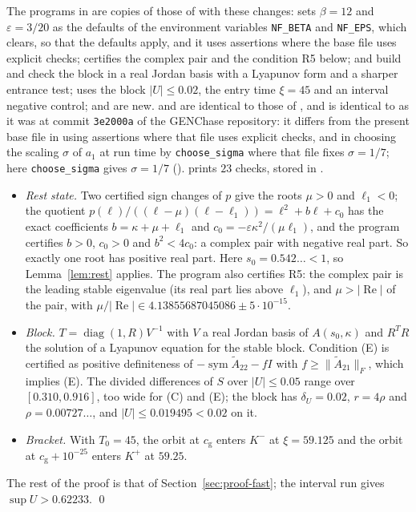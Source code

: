 \documentclass[11pt]{article}
\theoremstyle{definition}
\newcommand{\eps}{\varepsilon}
\newcommand{\re}{\operatorname{Re}}
\newcommand{\sym}{\operatorname{sym}}
\begin{document}
The programs in  are copies of those of  with these changes:  sets $\beta = 12$ and $\eps = 3/20$ as the defaults of the environment variables \texttt{NF\_BETA} and \texttt{NF\_EPS}, which  clears, so that the defaults apply, and it uses assertions where the base file uses explicit checks;  certifies the complex pair and the condition R5 below;  and  build and check the block in a real Jordan basis with a Lyapunov form and a sharper entrance test;  uses the block $|U| \le 0.02$, the entry time $\xi = 45$ and an interval negative control;  and  are new.  and  are identical to those of , and  is identical to  as it was at commit \texttt{3e2000a} of the GENChase repository: it differs from the present base file in using assertions where that file uses explicit checks, and in choosing the scaling $\sigma$ of $a_1$ at run time by \texttt{choose\_sigma} where that file fixes $\sigma = 1/7$; here \texttt{choose\_sigma} gives $\sigma = 1/7$ ().  prints $23$ checks, stored in .
\begin{itemize}
\item \emph{Rest state.} Two certified sign changes of $p$ give the roots $\mu > 0$ and $\ell_1 < 0$; the quotient $p(\ell)/((\ell - \mu)(\ell - \ell_1)) = \ell^2 + b\ell + c_0$ has the exact coefficients $b = \kappa + \mu + \ell_1$ and $c_0 = -\eps\kappa^2/(\mu\ell_1)$, and the program certifies $b > 0$, $c_0 > 0$ and $b^2 < 4c_0$: a complex pair with negative real part. So exactly one root has positive real part. Here $s_0 = 0.542\ldots < 1$, so Lemma~\ref{lem:rest} applies. The program also certifies R5: the complex pair is the leading stable eigenvalue (its real part lies above $\ell_1$), and $\mu > |\re|$ of the pair, with $\mu/|\re| \in 4.13855687045086 \pm 5\cdot 10^{-15}$.
\item \emph{Block.} $T = \operatorname{diag}(1, R)V^{-1}$ with $V$ a real Jordan basis of $A(s_0, \kappa)$ and $R^TR$ the solution of a Lyapunov equation for the stable block. Condition (E) is certified as positive definiteness of $-\sym\tilde A_{22} - fI$ with $f \ge \|\tilde A_{21}\|_F$, which implies (E). The divided differences of $S$ over $|U| \le 0.05$ range over $[0.310, 0.916]$, too wide for (C) and (E); the block has $\delta_U = 0.02$, $r = 4\rho$ and $\rho = 0.00727\ldots$, and $|U| \le 0.019495 < 0.02$ on it.
\item \emph{Bracket.} With $T_0 = 45$, the orbit at $c_{\mathrm g}$ enters $K^-$ at $\xi = 59.125$ and the orbit at $c_{\mathrm g} + 10^{-25}$ enters $K^+$ at $59.25$.
\end{itemize}
The rest of the proof is that of Section~\ref{sec:proof-fast}; the interval run gives $\sup U > 0.62233$. \qed
\end{document}
